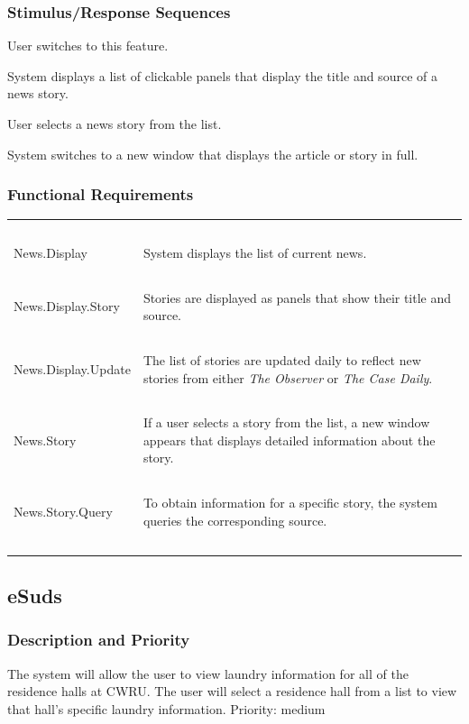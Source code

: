 \documentclass[pdftex,12pt,letter]{article}
\begin{document}
\subsubsection{Stimulus/Response Sequences}
\begin{description}\itemsep1pt
\item[Stimulus:] User switches to this feature.
\item[Response:] System displays a list of clickable panels that display the title and source of a news story.
\item[Stimulus:] User selects a news story from the list.
\item[Response:] System switches to a new window that displays the article or story in full.
\end{description}
\pagebreak
\subsubsection{Functional Requirements}
\begin{table}[!h]
\begin{tabularx}{\textwidth}[t]{|l Y|}
\hline
~&~\\
News.Display & System displays the list of current news.\\
~&~\\
News.Display.Story & Stories are displayed as panels that show their title and source.\\
~&~\\
News.Display.Update & The list of stories are updated daily to reflect new stories from either \emph{The Observer} or \emph{The Case Daily}.\\
~&~\\
News.Story & If a user selects a story from the list, a new window appears that displays detailed information about the story.\\
~&~\\
News.Story.Query & To obtain information for a specific story, the system queries the corresponding source.\\
~&~\\
\hline
\end{tabularx}
\end{table}
\FloatBarrier
\subsection{eSuds}
\subsubsection{Description and Priority}
The system will allow the user to view laundry information for all of the residence halls at CWRU. The user will select a residence hall from a list to view that hall's specific laundry information. Priority: medium
\end{document}
